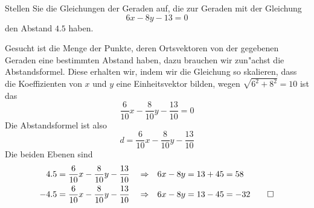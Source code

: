 Stellen Sie die Gleichungen der Geraden auf, die zur Geraden mit der
Gleichung
\[
6x-8y-13=0
\]
den Abstand $4.5$ haben.

\begin{loesung}
Gesucht ist die Menge der Punkte, deren Ortsvektoren von der gegebenen
Geraden eine bestimmten Abstand haben, dazu brauchen wir zun"achst die
Abstandsformel. Diese erhalten wir, indem wir die Gleichung so skalieren,
dass die Koeffizienten von $x$ und $y$ eine Einheitsvektor bilden,
wegen $\sqrt{6^2+8^2}=10$ ist das
\[
\frac{6}{10}x-\frac{8}{10}y-\frac{13}{10}=0
\]
Die Abstandsformel ist also
\[
d =\frac{6}{10}x-\frac{8}{10}y-\frac{13}{10}
\]
Die beiden Ebenen sind
\begin{align*}
4.5&=\frac{6}{10}x-\frac{8}{10}y-\frac{13}{10}&&\Rightarrow&
6x-8y&=13+45=58
\\
-4.5&=\frac{6}{10}x-\frac{8}{10}y-\frac{13}{10}&&\Rightarrow&
6x-8y&=13-45=-32
\qedhere
\end{align*}
\end{loesung}


